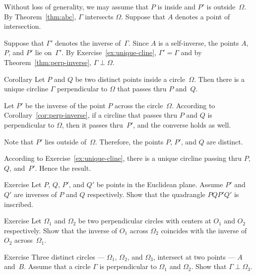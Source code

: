 Without loss of generality, we may assume that $P$ is inside and $P'$ is outside~$\Omega$.
By Theorem~\ref{thm:abc}, $\Gamma$ intersects $\Omega$.
Suppose that $A$ denotes a point of intersection.

Suppose that $\Gamma'$ denotes the inverse of~$\Gamma$.
Since $A$ is a self-inverse, the points $A$, $P$, and $P'$ lie on~$\Gamma'$.
By Exercise~\ref{ex:unique-cline},
$\Gamma'=\Gamma$
and by Theorem~\ref{thm:perp-inverse}, $\Gamma\perp\Omega$.
\qeds

\begin{thm}{Corollary}\label{cor:h-line} 
Let $P$ and $Q$ be two distinct points inside a circle~$\Omega$.
Then there is a unique circline $\Gamma$ perpendicular to $\Omega$ that passes thru $P$ and~$Q$.  
\end{thm}

Let $P'$ be the inverse of the point $P$ across the circle~$\Omega$.
According to Corollary~\ref{cor:perp-inverse},
if a circline that passes thru $P$ and $Q$ is perpendicular to $\Omega$, then it passes thru~$P'$, and the converse holds as well.

Note that $P'$ lies outside of~$\Omega$.
Therefore, the points $P$, $P'$, and $Q$ are distinct.

According to Exercise~\ref{ex:unique-cline},
there is a unique circline passing thru $P$, $Q$, and~$P'$.
Hence the result.
\qeds

\begin{thm}{Exercise}\label{ex:inscribed+inv}
Let $P$, $Q$, $P'$, and $Q'$ be points in the Euclidean plane.
Assume $P'$ and $Q'$ are inverses of $P$ and $Q$ respectively.
Show that the quadrangle $PQP'Q'$ is inscribed.
\end{thm}

\begin{thm}{Exercise}\label{ex:centers-of-perp-circles}
Let $\Omega_1$ and $\Omega_2$ be two perpendicular circles with centers at $O_1$ and $O_2$ respectively.
Show that the inverse of $O_1$ across $\Omega_2$ 
coincides with 
the inverse of $O_2$ across~$\Omega_1$.
\end{thm}

\begin{thm}{Exercise}\label{ex:4-th-perp-circ}
Three distinct circles --- $\Omega_1$, $\Omega_2$, and $\Omega_3$, intersect at two points --- $A$ and~$B$.
Assume that a circle $\Gamma$ is perpendicular to $\Omega_1$ and $\Omega_2$.
Show that $\Gamma\perp\Omega_3$.
\end{thm}

